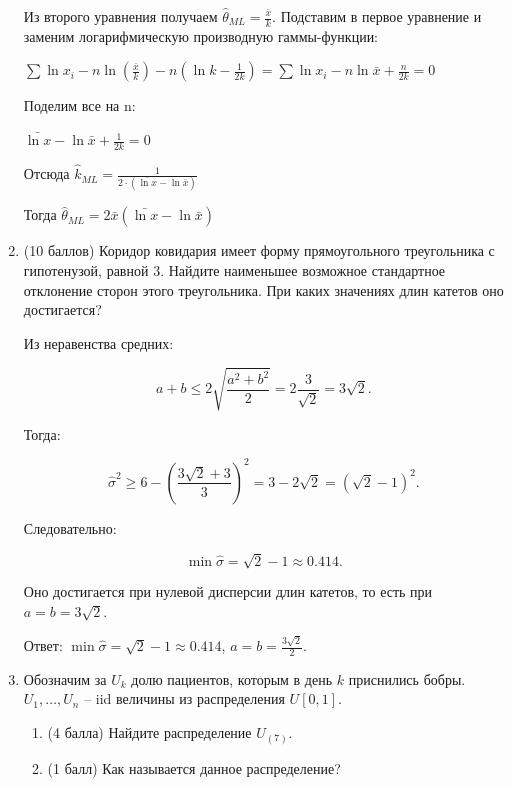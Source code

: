 \documentclass[12pt]{article}
\newenvironment{solution}{}{}
\begin{document}
\begin{enumerate}
\begin{solution}
  Из второго уравнения получаем $\hat{\theta}_{ML} = \frac{\bar{x}}{k}$. Подставим в первое уравнение и заменим логарифмическую производную гаммы-функции:
  
  $\sum \ln{x_i} - n\ln{(\frac{\bar{x}}{k})} - n (\ln{k} - \frac{1}{2k}) = \sum \ln{x_i} - n\ln{\bar{x}} + \frac{n}{2k} = 0$
  
  Поделим все на n:
  
   $\bar{\ln{x}} - \ln{\bar{x}} + \frac{1}{2k} = 0$
   
   Отсюда $\hat{k}_{ML} = \frac{1}{2 \cdot(\bar{\ln{x}} - \ln{\bar{x}})}$ 
   
   Тогда $\hat{\theta}_{ML} = 2\bar{x}(\bar{\ln{x}} - \ln{\bar{x}})$
\end{solution}
    
    \item (10 баллов) Коридор ковидария имеет форму прямоугольного треугольника с гипотенузой, равной $3$. Найдите наименьшее возможное стандартное отклонение сторон этого треугольника. При каких значениях длин катетов оно достигается? 

\begin{solution}   
    Из неравенства средних:
    
    $$a+b \leq 2\sqrt{\frac{a^2+b^2}{2}}=2\frac{3}{\sqrt{2}}=3\sqrt{2}.$$
    
    Тогда:
    
    $$\hat{\sigma}^2 \geq 6-(\frac{3\sqrt{2}+3}{3})^2=3-2\sqrt{2}=(\sqrt{2}-1)^2.$$
    
   Следовательно: 
   
   $$\min{\hat{\sigma}}=\sqrt{2}-1 \approx 0.414.$$
   
   Оно достигается при нулевой дисперсии длин катетов, то есть при $a=b=3\sqrt{2}$.
    
    Ответ: $\min{\hat{\sigma}} = \sqrt{2} - 1 \approx 0.414$, $a = b = \frac{3\sqrt{2}}{2}$.
\end{solution}

    \item Обозначим за $U_k$ долю пациентов, которым в день $k$ приснились бобры. $U_1, \ldots, U_n$ -- iid величины из распределения $U[0, 1]$. 
    
    \begin{enumerate}
        \item (4 балла) Найдите распределение $U_{(7)}$.
        \item (1 балл) Как называется данное распределение?
    \end{enumerate} 
    

\end{enumerate}
\end{document}
